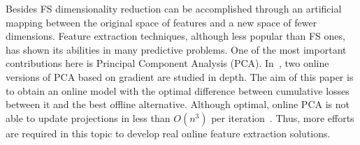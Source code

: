 \documentclass[preprint,12pt]{elsarticle}
\begin{document}
Besides FS dimensionality reduction can be accomplished through an artificial mapping between the original space of features and a new space of fewer dimensions. Feature extraction techniques, although less popular than FS ones, has shown its abilities in many predictive problems. One of the most important contributions here is Principal Component Analysis (PCA). In~\cite{nie16}, two online versions of PCA based on gradient are studied in depth. The aim of this paper is to obtain an online model with the optimal difference between cumulative losses between it and the best offline alternative. Although optimal, online PCA is not able to update projections in less than $O(n^3)$ per iteration~\cite{hazan10}. Thus, more efforts are required in this topic to develop real online feature extraction solutions.



\end{document}
